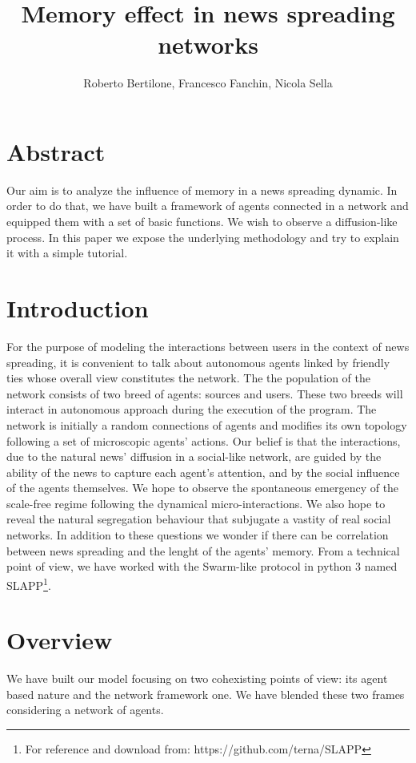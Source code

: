 \documentclass[11pt]{article} %
\title{Memory effect in news spreading networks}
\author{Roberto Bertilone, Francesco Fanchin, Nicola Sella}
\begin{document}
\maketitle
\section*{Abstract}
Our aim is to analyze the influence of memory in a news spreading dynamic. In order to do that, we have built a framework of agents 
connected in a network and equipped them with a set of basic functions. We wish to observe a diffusion-like process.
In this paper we expose the underlying methodology and try to explain it with a simple tutorial.

\section{Introduction}

For the purpose of modeling the interactions between users in the context of news spreading, it is convenient to talk about autonomous agents
linked by friendly ties whose overall view constitutes the network.
The the population of the network consists of two breed of agents: sources and users. These two breeds will interact
in autonomous approach during the execution of the program.
The network is initially a random connections of agents and modifies its own topology following a set of microscopic agents' actions.
Our belief is that the interactions, due to the natural news' diffusion in a social-like network, are guided by the ability of the news
to capture each agent's attention, and by the social influence of the agents themselves.
We hope to observe the spontaneous emergency of the scale-free regime following the dynamical micro-interactions. We also hope to reveal 
the natural segregation behaviour that subjugate a vastity of real social networks.
In addition to these questions we wonder if there can be correlation between news spreading and the lenght of the agents' memory.
From a technical point of view, we have worked with the Swarm-like protocol in python 3 named SLAPP\footnote{For reference and download from: https://github.com/terna/SLAPP}.

\section{Overview}
We have built our model focusing on two cohexisting points of view: its agent based nature and the network framework one. 
We have blended these two frames considering a network of agents. 
\end{document}
